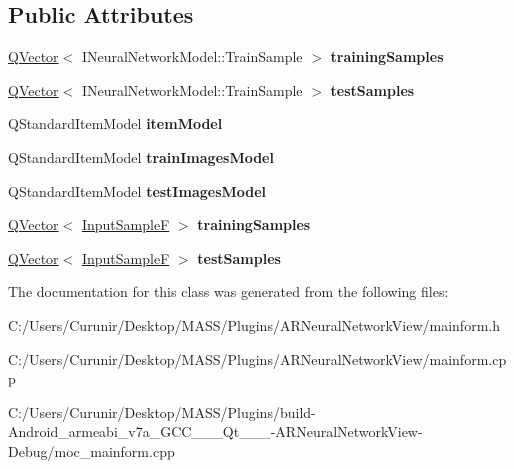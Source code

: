 \subsection*{Public Attributes}
\begin{DoxyCompactItemize}
\item 
\mbox{\label{class_main_form_ae3827327ab01288622f789ffd9a061d9}} 
\hyperlink{class_q_vector}{Q\+Vector}$<$ I\+Neural\+Network\+Model\+::\+Train\+Sample $>$ {\bfseries training\+Samples}
\item 
\mbox{\label{class_main_form_a869b2038409b2ba9fad616af593a97a3}} 
\hyperlink{class_q_vector}{Q\+Vector}$<$ I\+Neural\+Network\+Model\+::\+Train\+Sample $>$ {\bfseries test\+Samples}
\item 
\mbox{\label{class_main_form_a7786cdf045d6037668f86b6db1277ba3}} 
Q\+Standard\+Item\+Model {\bfseries item\+Model}
\item 
\mbox{\label{class_main_form_af5cdf86f72c4e89d8038b1594078b2a3}} 
Q\+Standard\+Item\+Model {\bfseries train\+Images\+Model}
\item 
\mbox{\label{class_main_form_afcb8254310b51c1fd58c3852a6f063fa}} 
Q\+Standard\+Item\+Model {\bfseries test\+Images\+Model}
\item 
\mbox{\label{class_main_form_a52b405f679729e32653e468a14aec648}} 
\hyperlink{class_q_vector}{Q\+Vector}$<$ \hyperlink{class_q_pair}{Input\+SampleF} $>$ {\bfseries training\+Samples}
\item 
\mbox{\label{class_main_form_a04762603238b7eace528239e5354a632}} 
\hyperlink{class_q_vector}{Q\+Vector}$<$ \hyperlink{class_q_pair}{Input\+SampleF} $>$ {\bfseries test\+Samples}
\end{DoxyCompactItemize}


The documentation for this class was generated from the following files\+:\begin{DoxyCompactItemize}
\item 
C\+:/\+Users/\+Curunir/\+Desktop/\+M\+A\+S\+S/\+Plugins/\+A\+R\+Neural\+Network\+View/mainform.\+h\item 
C\+:/\+Users/\+Curunir/\+Desktop/\+M\+A\+S\+S/\+Plugins/\+A\+R\+Neural\+Network\+View/mainform.\+cpp\item 
C\+:/\+Users/\+Curunir/\+Desktop/\+M\+A\+S\+S/\+Plugins/build-\/\+Android\+\_\+armeabi\+\_\+v7a\+\_\+\+G\+C\+C\+\_\+\_\+\_\+\+Qt\+\_\+\_\+\_-\/\+A\+R\+Neural\+Network\+View-\/\+Debug/moc\+\_\+mainform.\+cpp\end{DoxyCompactItemize}
